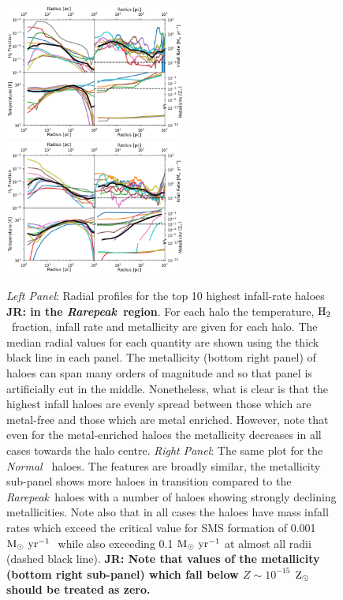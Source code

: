 \documentclass[twocolumn,iop,revtex4]{openjournal}
\newcommand{\msolaryr} {$\rm{M_{\odot}~yr^{-1}}~$}
\newcommand{\zsolar} {$\rm{Z_{\odot}}~$}
\newcommand{\molH} {$\rm{H_2}$~}
\newcommand{\rarepeak} {\textit{Rarepeak~}}
\newcommand{\normal} {\textit{Normal~}}
\def\jr#1{{\color{blue} \bf JR:  #1}}
\begin{document}
\begin{figure} [!t]
\centering
\begin{minipage}{175mm}      \begin{center} 
\centerline{
\includegraphics[width=0.525\textwidth]{FIGURES/MultiPlot_Rarepeak.png}
\includegraphics[width=0.525\textwidth]{FIGURES/MultiPlot_Normal.png}}
\caption{\textit{Left Panel}: Radial profiles for the top 10 highest infall-rate haloes
  \jr{in the \rarepeak region}. For
  each halo the temperature, \molH fraction, infall rate and metallicity are given for
  each halo. The median radial values for each quantity are shown using the
  thick black line in each panel. The metallicity (bottom right panel) of haloes can span many
  orders of magnitude and so that panel is artificially cut in the middle. Nonetheless, what is
  clear is that the highest infall haloes are evenly spread between those which are metal-free and
  those which are metal enriched. However, note that even for the metal-enriched haloes the
  metallicity decreases in all cases towards the halo centre. 
  \textit{Right Panel}: The same plot for the \normal
  haloes. The features are broadly similar, the metallicity sub-panel shows more haloes in transition
  compared to the \rarepeak haloes with a number of haloes showing strongly declining metallicities.
  Note also that in all cases the haloes have mass infall rates which exceed the critical value
  for SMS formation of 0.001 \msolaryr \citep{Haemmerle_2018} while also exceeding
  0.1 \msolaryr at almost all radii (dashed black line).
  \jr{Note that values of the metallicity (bottom right sub-panel) which fall below $Z \sim 10^{-15}$ \zsolar should be
    treated as zero.}
} \label{Fig:RadialProfiles}
\end{center} \end{minipage}

\end{figure}
\end{document}
